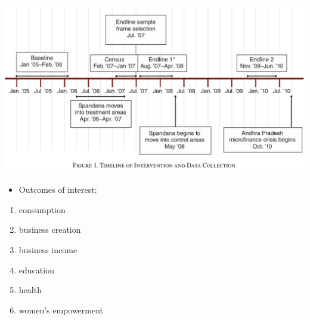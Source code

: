 \documentclass[
  letterpaper,
  DIV=11,
  numbers=noendperiod]{scrreprt}
\providecommand{\tightlist}{%
  \setlength{\itemsep}{0pt}\setlength{\parskip}{0pt}}\usepackage{longtable,booktabs,array}
\theoremstyle{definition}
\theoremstyle{remark}
\begin{document}
\includegraphics{Images/Banerjee_Timeline_1.png}

\begin{itemize}
\tightlist
\item
  Outcomes of interest:
\end{itemize}

\begin{enumerate}
\def\labelenumi{\arabic{enumi}.}
\tightlist
\item
  consumption
\item
  business creation
\item
  business income
\item
  education
\item
  health
\item
  women's empowerment
\end{enumerate}
\end{document}
